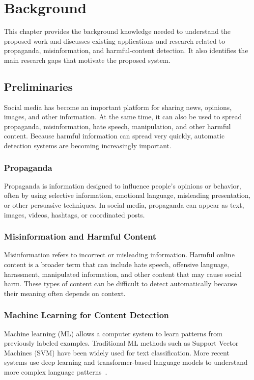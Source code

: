 \chapter{Background}
\label{ch:background}

This chapter provides the background knowledge needed to understand the proposed
work and discusses existing applications and research related to propaganda,
misinformation, and harmful-content detection. It also identifies the main research
gaps that motivate the proposed system.

\section{Preliminaries}
Social media has become an important platform for sharing news, opinions, images,
and other information. At the same time, it can also be used to spread propaganda,
misinformation, hate speech, manipulation, and other harmful content. Because
harmful information can spread very quickly, automatic detection systems are
becoming increasingly important.

\subsection{Propaganda}
Propaganda is information designed to influence people's opinions or behavior, often
by using selective information, emotional language, misleading presentation, or
other persuasive techniques. In social media, propaganda can appear as text,
images, videos, hashtags, or coordinated posts.

\subsection{Misinformation and Harmful Content}
Misinformation refers to incorrect or misleading information. Harmful online
content is a broader term that can include hate speech, offensive language,
harassment, manipulated information, and other content that may cause social harm.
These types of content can be difficult to detect automatically because their
meaning often depends on context.

\subsection{Machine Learning for Content Detection}
Machine learning (ML) allows a computer system to learn patterns from previously
labeled examples. Traditional ML methods such as Support Vector Machines (SVM) have
been widely used for text classification. More recent systems use deep learning and
transformer-based language models to understand more complex language
patterns~\cite{duridi2025,plikynas2025}.

